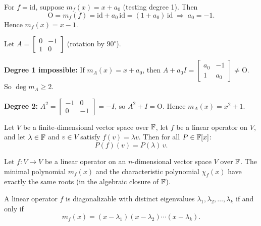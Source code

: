 \begin{exbox}
\label{ex:min-poly-id}
For $f=\mathrm{id}$, suppose $m_f(x)=x+a_0$ (testing degree 1).  Then
\[
    \mathrm{O}=m_f(f)=\mathrm{id}+a_0\,\mathrm{id}=(1+a_0)\,\mathrm{id}
    \;\Longrightarrow\; a_0=-1.
\]
Hence $m_f(x)=x-1$.
\end{exbox}

\begin{exbox}
\label{ex:min-poly-rotation}
Let $A=\begin{bmatrix}0&-1\\1&0\end{bmatrix}$ (rotation by $90^\circ$).

\medskip\noindent
\textbf{Degree 1 impossible:} If $m_A(x)=x+a_0$, then
$A+a_0 I=\begin{bmatrix}a_0&-1\\1&a_0\end{bmatrix}\neq\mathrm{O}$.
So $\deg m_A\ge 2$.

\medskip\noindent
\textbf{Degree 2:}
$A^2=\begin{bmatrix}-1&0\\0&-1\end{bmatrix}=-I$,
so $A^2+I=\mathrm{O}$.
Hence $m_A(x)=x^2+1$.
\end{exbox}

\begin{thmbox}
\label{lem:eigenvalue-poly}
Let $V$ be a finite-dimensional vector space over $\mathbb{F}$, let $f$ be a
linear operator on $V$, and let $\lambda\in\mathbb{F}$ and $v\in V$ satisfy
$f(v)=\lambda v$.  Then for all $P\in\mathbb{F}[x]$:
\[
    P(f)(v) = P(\lambda)\,v.
\]
\end{thmbox}

\begin{thmbox}
\label{thm:min-char-same-roots}
Let $f:V\to V$ be a linear operator on an $n$-dimensional vector space
$V$ over $\mathbb{F}$.  The minimal polynomial $m_f(x)$ and the characteristic
polynomial $\chi_f(x)$ have exactly the same roots (in the algebraic
closure of $\mathbb{F}$).
\end{thmbox}

\begin{corbox}
\label{cor:min-poly-diag}
A linear operator $f$ is diagonalizable with distinct eigenvalues
$\lambda_1,\lambda_2,\ldots,\lambda_k$ if and only if
\[
    m_f(x) = (x-\lambda_1)(x-\lambda_2)\cdots(x-\lambda_k).
\]
\end{corbox}

